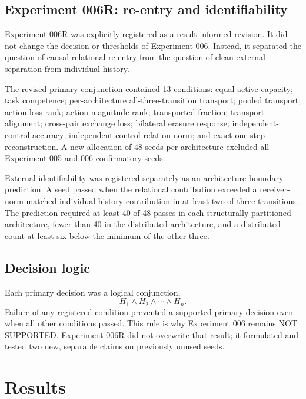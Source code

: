 \documentclass[11pt,a4paper]{article}
\newcommand{\statusnotsupported}{\textsf{NOT SUPPORTED}}
\begin{document}
\subsection{Experiment 006R: re-entry and identifiability}

Experiment 006R was explicitly registered as a result-informed revision. It did not change the decision or thresholds of Experiment 006. Instead, it separated the question of causal relational re-entry from the question of clean external separation from individual history.

The revised primary conjunction contained 13 conditions: equal active capacity; task competence; per-architecture all-three-transition transport; pooled transport; action-loss rank; action-magnitude rank; transported fraction; transport alignment; cross-pair exchange loss; bilateral erasure response; independent-control accuracy; independent-control relation norm; and exact one-step reconstruction. A new allocation of 48 seeds per architecture excluded all Experiment 005 and 006 confirmatory seeds.

External identifiability was registered separately as an architecture-boundary prediction. A seed passed when the relational contribution exceeded a receiver-norm-matched individual-history contribution in at least two of three transitions. The prediction required at least 40 of 48 passes in each structurally partitioned architecture, fewer than 40 in the distributed architecture, and a distributed count at least six below the minimum of the other three.

\subsection{Decision logic}

Each primary decision was a logical conjunction,
\begin{equation}
  H_1 \land H_2 \land \cdots \land H_n.
\end{equation}
Failure of any registered condition prevented a supported primary decision even when all other conditions passed. This rule is why Experiment 006 remains \statusnotsupported. Experiment 006R did not overwrite that result; it formulated and tested two new, separable claims on previously unused seeds.

\section{Results}
\end{document}
